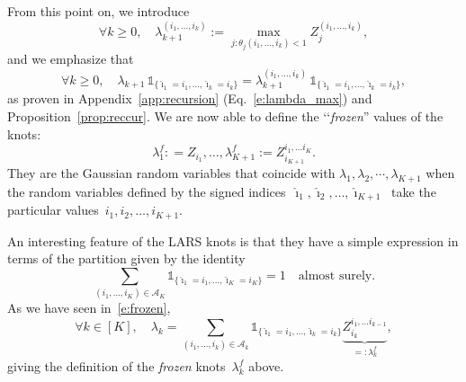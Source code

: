 \documentclass[final,numbib]{imaiai}%
\numberwithin{equation}{section}
\def\eq{\begin{equation}}
\def\qe{\end{equation}}
\def\cA{\mathcal{A}}
\renewcommand{\hat}{\widehat}
\newcommand{\<}{\langle}
\renewcommand{\>}{\rangle}
\newcommand{\1}{\mathds{1}}
\begin{document}
{\noindent
From this point on, we introduce
\eq
\label{e:frozenLambda}
\forall k\geq 0,\quad
\lambda_{k+1}^{(i_1,\ldots, i_{k})}:=\max_{j: \theta_j(i_1, \ldots, i_{k})<1}Z^{(i_1,\ldots, i_{k})}_j,
\qe
and we emphasize that
\eq
\label{e:unfrozen}
\forall k\geq 0,\quad
\lambda_{k+1}\,\mathds 1_{\{\hat \imath_1=i_1,\ldots, \hat \imath_{k}=i_k\}}=\lambda_{k+1}^{(i_1,\ldots, i_{k})}\,\mathds 1_{\{\hat \imath_1=i_1,\ldots, \hat \imath_{k}=i_k\}},
\qe
as proven in Appendix~\ref{app:recursion} (Eq.~\eqref{e:lambda_max}) and Proposition~\ref{prop:reccur}.
We are now  able to define the ‘‘{\it frozen}''  values of the knots:
\eq \label{e:frozen}
 \lambda^f_1 : = Z_{i_1}, \ldots , \lambda^f_{K+1} :=   Z^{i_1,\ldots i_K}_{i_{K+1}}.
  \qe
They are the Gaussian random variables that coincide  with $\lambda_1,\lambda_2,\cdots ,  \lambda_{K+1}$  when the random variables defined by the signed indices~$\hat  \imath_1,\hat  \imath_2, \ldots,  \hat \imath_{K+1}~$ take the particular  values~$i_1, i_2,\ldots, i_{K+1}$.

\begin{remark}
An interesting feature of the LARS knots is that they have a simple expression in terms of the partition given by the identity
\[
\sum_{(i_1,\ldots,i_{K})\in\cA_{K}}\mathds 1_{\{\hat \imath_1=i_1,\ldots,\hat \imath_{K}=i_{K}\}}=1\quad\text{almost\ surely}.
\]
As we have seen in~\eqref{e:frozen},
\[
\forall k\in [K],\quad
\lambda_k=\sum_{(i_1,\ldots,i_{k}) \in\cA_{k}}\mathds 1_{\{\hat \imath_1=i_1,\ldots,\hat \imath_{k}=i_{k}\}}\underbrace{Z^{i_1,\ldots i_{k-1}}_{i_{k}}}_{=:\lambda^f_k},
\]
giving the definition of the {\it frozen} knots~$\lambda^f_k$ above.
\end{remark}

}
\end{document}
